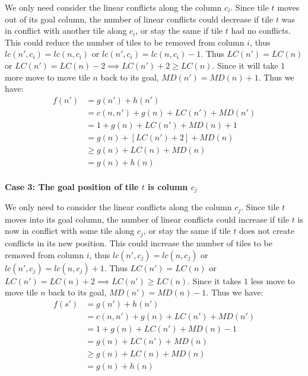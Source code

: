 \documentclass{llncs}
\begin{document}
We only need consider the linear conflicts along the column $c_i$. Since tile $t$ moves out of its goal column, the number of linear conflicts could decrease if tile $t$ was in conflict with another tile along $c_i$, or stay the same if tile $t$ had no conflicts. This could reduce the number of tiles to be removed from column $i$, thus $lc(n',c_i) =lc(n,c_i)$ or $lc(n',c_i) = lc(n,c_i)-1$. Thus $LC(n') = LC(n)$ or $LC(n') = LC(n) - 2 \implies LC(n') + 2 \geq LC(n)$. Since it will take $1$ more move to move tile $n$ back to its goal, $MD(n') = MD(n) + 1$. Thus we have:
\begin{align}
    f(n') \nonumber
    	&= g(n') + h(n') \\\nonumber
        &= c(n,n') + g(n) + LC(n') + MD(n') \\\nonumber
        &= 1 + g(n) + LC(n') + MD(n) + 1 \\\nonumber
        &= g(n) + [LC(n') + 2] + MD(n) \\\nonumber
        &\geq g(n) + LC(n) + MD(n) \\\nonumber
        &= g(n) + h(n) \\\nonumber
\end{align}

\textbf{Case 3: The goal position of tile $t$ is column $c_j$}

We only need to consider the linear conflicts along the column $c_j$. Since tile $t$ moves into its goal column, the number of linear conflicts could increase if tile $t$ is now in conflict with some tile along $c_j$, or stay the same if tile $t$ does not create conflicts in its new position. This could increase the number of tiles to be removed from column $i$, thus $lc(n',c_j) =lc(n,c_j)$ or $lc(n',c_j) = lc(n,c_j)+1$. Thus $LC(n') = LC(n)$ or $LC(n') = LC(n) + 2 \implies LC(n') \geq LC(n)$. Since it takes $1$ less move to move tile $n$ back to its goal, $MD(n') = MD(n) - 1$. Thus we have:
\begin{align}
    f(s') \nonumber &= g(n') + h(n') \\\nonumber
        &= c(n,n') + g(n) + LC(n') + MD(n') \\\nonumber
        &= 1 + g(n) + LC(n') + MD(n) - 1 \\\nonumber
        &= g(n) + LC(n') + MD(n) \\\nonumber
        &\geq g(n) + LC(n) + MD(n) \\\nonumber
        &= g(n) + h(n) \\\nonumber
\end{align}
\end{document}
